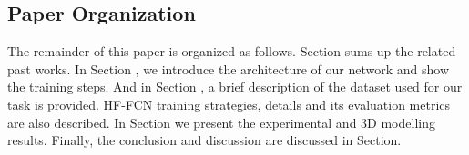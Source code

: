 \subsection{Paper Organization}
\setlength{\parindent}{2ex}The remainder of this paper is organized as follows. Section \uppercase\expandafter{} sums up the related past works. In Section \uppercase\expandafter{}, we introduce the architecture of our network and show the training steps. And in Section \uppercase\expandafter{}, a brief description of the dataset used for our task is provided. HF-FCN training strategies, details and its evaluation metrics are also described. In Section \uppercase\expandafter{} we present the experimental and 3D modelling results. Finally, the conclusion and discussion are discussed in Section\uppercase\expandafter{}.
